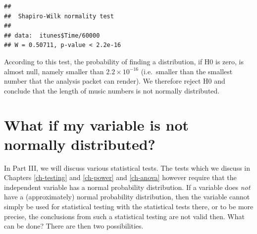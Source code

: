 \documentclass[
]{book}
\newenvironment{Shaded}{\begin{snugshade}}{\end{snugshade}}
\newcommand{\AttributeTok}[1]{\textcolor[rgb]{0.13,0.29,0.53}{#1}}
\newcommand{\CommentTok}[1]{\textcolor[rgb]{0.56,0.35,0.01}{\textit{#1}}}
\newcommand{\ConstantTok}[1]{\textcolor[rgb]{0.56,0.35,0.01}{#1}}
\newcommand{\DecValTok}[1]{\textcolor[rgb]{0.00,0.00,0.81}{#1}}
\newcommand{\FunctionTok}[1]{\textcolor[rgb]{0.13,0.29,0.53}{\textbf{#1}}}
\newcommand{\NormalTok}[1]{#1}
\newcommand{\OtherTok}[1]{\textcolor[rgb]{0.56,0.35,0.01}{#1}}
\newcommand{\SpecialCharTok}[1]{\textcolor[rgb]{0.81,0.36,0.00}{\textbf{#1}}}
\newcommand{\StringTok}[1]{\textcolor[rgb]{0.31,0.60,0.02}{#1}}
\begin{document}
\begin{Shaded}
\end{Shaded}

\begin{Shaded}
\end{Shaded}

\begin{verbatim}
## 
##  Shapiro-Wilk normality test
## 
## data:  itunes$Time/60000
## W = 0.50711, p-value < 2.2e-16
\end{verbatim}

According to this test, the probability of finding a distribution, if H0 is
zero, is almost null, namely smaller than \(2.2 \times 10^{-16}\) (i.e.~smaller than
the smallest number that the analysis packet can render). We therefore
reject H0 and conclude that the length of music numbers is not normally
distributed.

\section{What if my variable is not normally distributed?}\label{sec:whatifnotnormal}

In Part III, we will discuss various statistical tests.
The tests which we discuss in Chapters \ref{ch-testing} and \ref{ch-power} and
\ref{ch-anova} however require that the independent
variable has a normal probability distribution. If a variable does \emph{not} have
a (approximately) normal probability distribution, then the variable cannot
simply be used for statistical testing with the statistical tests
there, or to be more precise, the conclusions from such a statistical testing
are not valid then. What can be done? There are then two
possibilities.
\end{document}
